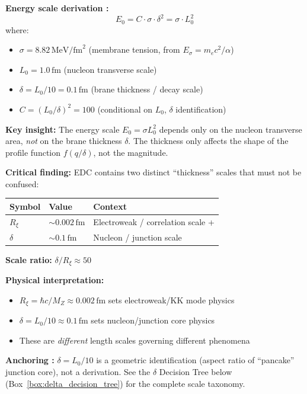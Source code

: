 \textbf{Energy scale derivation \tagDc{}:}
\begin{equation}
\label{eq:E0_derivation}
E_0 = C \cdot \sigma \cdot \delta^2 = \sigma \cdot L_0^2
\end{equation}
where:
\begin{itemize}[nosep]
  \item $\sigma = 8.82\,\mathrm{MeV/fm}^2$ \tagDc{} (membrane tension, from $E_\sigma = m_e c^2/\alpha$)
  \item $L_0 = 1.0\,\mathrm{fm}$ \tagI{} (nucleon transverse scale)
  \item $\delta = L_0/10 = 0.1\,\mathrm{fm}$ \tagI{} (brane thickness / decay scale)
  \item $C = (L_0/\delta)^2 = 100$ \tagDc{} (conditional on $L_0$, $\delta$ identification)
\end{itemize}

\textbf{Key insight:} The energy scale $E_0 = \sigma L_0^2$ depends only on the nucleon
transverse area, \emph{not} on the brane thickness $\delta$. The thickness only affects
the shape of the profile function $f(q/\delta)$, not the magnitude.

\begin{tcolorbox}[colback=yellow!5!white, colframe=yellow!50!black,
                  title={\textbf{Brane Thickness Audit: Two Distinct Scales}}]
\label{box:delta_audit}
\textbf{Critical finding:} EDC contains two distinct ``thickness'' scales that must not be confused:

\begin{center}
\begin{tabular}{lll}
\toprule
\textbf{Symbol} & \textbf{Value} & \textbf{Context} \\
\midrule
$R_\xi$ & $\sim 0.002\,\mathrm{fm}$ & Electroweak / correlation scale \tagP{}+\tagBL{} \\
$\delta$ & $\sim 0.1\,\mathrm{fm}$ & Nucleon / junction scale \tagI{} \\
\bottomrule
\end{tabular}
\end{center}

\textbf{Scale ratio:} $\delta / R_\xi \approx 50$

\textbf{Physical interpretation:}
\begin{itemize}[nosep]
  \item $R_\xi = \hbar c / M_Z \approx 0.002\,\mathrm{fm}$ sets electroweak/KK mode physics
  \item $\delta = L_0/10 \approx 0.1\,\mathrm{fm}$ sets nucleon/junction core physics
  \item These are \emph{different} length scales governing different phenomena
\end{itemize}

\textbf{Anchoring \tagI{}:} $\delta = L_0/10$ is a geometric identification (aspect ratio of
``pancake'' junction core), not a derivation. See the $\delta$ Decision Tree below
(Box~\ref{box:delta_decision_tree}) for the complete scale taxonomy.
\end{tcolorbox}

